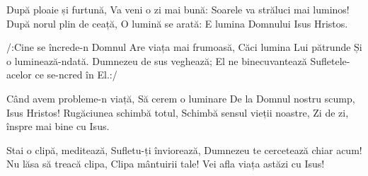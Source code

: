 
\beginverse
După ploaie și furtună,
Va veni o zi mai bună:
Soarele va străluci mai luminos!
După norul plin de ceață,
O lumină se arată:
E lumina Domnului Isus Hristos.
\endverse

\beginchorus
/:Cine se încrede-n Domnul
Are viața mai frumoasă,
Căci lumina Lui pătrunde
Și o luminează-ndată.
Dumnezeu de sus veghează;
El ne binecuvantează
Sufletele-acelor ce se-ncred în El.:/
\endchorus

\beginverse
Când avem probleme-n viață,
Să cerem o luminare
De la Domnul nostru scump, Isus Hristos!
Rugăciunea schimbă totul,
Schimbă sensul vieții noastre,
Zi de zi, înspre mai bine cu Isus.
\endverse

\beginverse
Stai o clipă, meditează,
Sufletu-ți înviorează,
Dumnezeu te cercetează chiar acum!
Nu lăsa să treacă clipa,
Clipa mântuirii tale!
Vei afla viața astăzi cu Isus!
\endverse

\endsong

